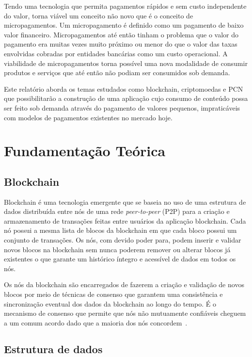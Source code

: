 \documentclass[12pt]{article}
\begin{document}
Tendo uma tecnologia que permita pagamentos rápidos e sem custo independente do valor, torna viável um conceito não novo que é o conceito de micropagamentos. Um micropagamento é definido como um pagamento de baixo valor financeiro. Micropagamentos até então tinham o problema que o valor do pagamento era muitas vezes muito próximo ou menor do que o valor das taxas envolvidas cobradas por entidades bancárias como um custo operacional. A viabilidade de micropagamentos torna possível uma nova modalidade de consumir produtos e serviços que até então não podiam ser consumidos sob demanda.

Este relatório aborda os temas estudados como blockchain, criptomoedas e PCN que possibilitarão a construção de uma aplicação cujo consumo de conteúdo possa ser feito sob demanda através do pagamento de valores pequenos, impraticáveis com modelos de pagamentos existentes no mercado hoje.

\section{Fundamentação Teórica}

\subsection{Blockchain}

Blockchain é uma tecnologia emergente que se baseia no uso de uma estrutura de dados distribuída entre nós de uma rede \emph{peer-to-peer} (P2P) para a criação e armazenamento de transações feitas entre usuários da aplicação blockchain. Cada nó possui a mesma lista de blocos da blockchain em que cada bloco possui um conjunto de transações. Os nós, com devido poder para, podem inserir e validar novos blocos na blockchain sem nunca poderem remover ou alterar blocos já existentes o que garante um histórico íntegro e acessível de dados em todos os nós.

Os nós da blockchain são encarregados de fazerem a criação e validação de novos blocos por meio de técnicas de consenso que garantem uma consistência e sincronização eventual dos dados da blockchain ao longo do tempo. É o mecanismo de consenso que permite que nós não mutuamente confiáveis cheguem a um comum acordo dado que a maioria dos nós concordem~\cite{braga2017segurancca}.

\subsection{Estrutura de dados}
\end{document}
